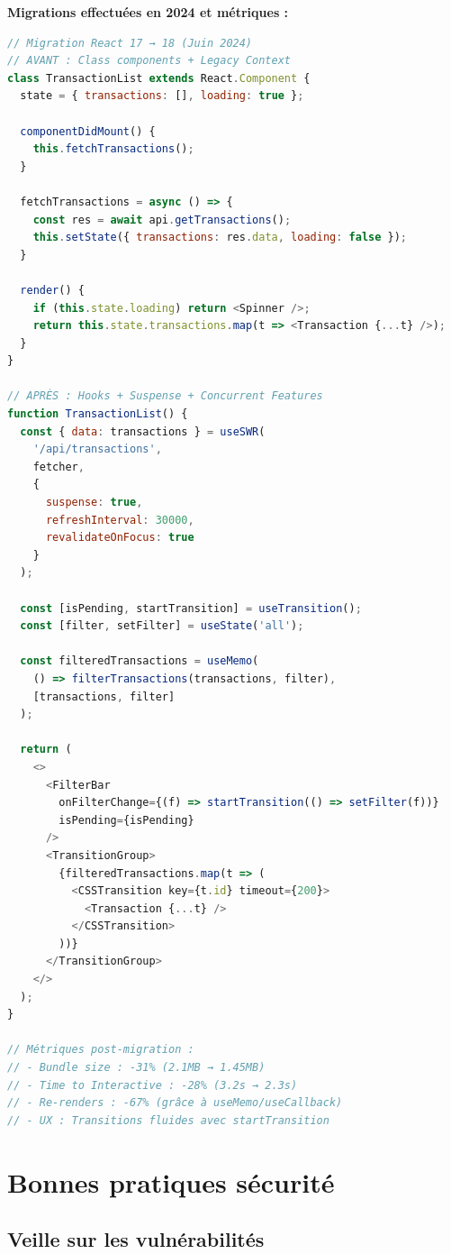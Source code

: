 \begin{exemple}
\textbf{Migrations effectuées en 2024 et métriques :}
\begin{lstlisting}[language=JavaScript]
// Migration React 17 → 18 (Juin 2024)
// AVANT : Class components + Legacy Context
class TransactionList extends React.Component {
  state = { transactions: [], loading: true };
  
  componentDidMount() {
    this.fetchTransactions();
  }
  
  fetchTransactions = async () => {
    const res = await api.getTransactions();
    this.setState({ transactions: res.data, loading: false });
  }
  
  render() {
    if (this.state.loading) return <Spinner />;
    return this.state.transactions.map(t => <Transaction {...t} />);
  }
}

// APRÈS : Hooks + Suspense + Concurrent Features
function TransactionList() {
  const { data: transactions } = useSWR(
    '/api/transactions',
    fetcher,
    {
      suspense: true,
      refreshInterval: 30000,
      revalidateOnFocus: true
    }
  );
  
  const [isPending, startTransition] = useTransition();
  const [filter, setFilter] = useState('all');
  
  const filteredTransactions = useMemo(
    () => filterTransactions(transactions, filter),
    [transactions, filter]
  );
  
  return (
    <>
      <FilterBar 
        onFilterChange={(f) => startTransition(() => setFilter(f))}
        isPending={isPending}
      />
      <TransitionGroup>
        {filteredTransactions.map(t => (
          <CSSTransition key={t.id} timeout={200}>
            <Transaction {...t} />
          </CSSTransition>
        ))}
      </TransitionGroup>
    </>
  );
}

// Métriques post-migration :
// - Bundle size : -31% (2.1MB → 1.45MB)
// - Time to Interactive : -28% (3.2s → 2.3s)
// - Re-renders : -67% (grâce à useMemo/useCallback)
// - UX : Transitions fluides avec startTransition
\end{lstlisting}
\end{exemple}

\section{Bonnes pratiques sécurité}

\subsection{Veille sur les vulnérabilités}


